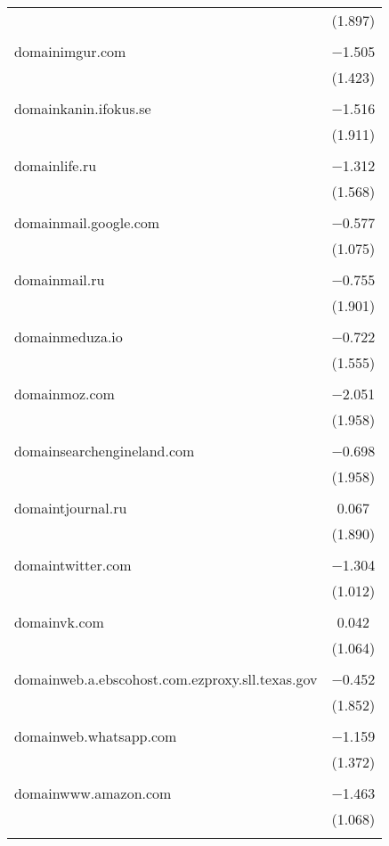 \begin{table}[!htbp]
\begin{tabular}{@{\extracolsep{5pt}}lc}
  & (1.897) \\ 
  & \\ 
 domainimgur.com & $-$1.505 \\ 
  & (1.423) \\ 
  & \\ 
 domainkanin.ifokus.se & $-$1.516 \\ 
  & (1.911) \\ 
  & \\ 
 domainlife.ru & $-$1.312 \\ 
  & (1.568) \\ 
  & \\ 
 domainmail.google.com & $-$0.577 \\ 
  & (1.075) \\ 
  & \\ 
 domainmail.ru & $-$0.755 \\ 
  & (1.901) \\ 
  & \\ 
 domainmeduza.io & $-$0.722 \\ 
  & (1.555) \\ 
  & \\ 
 domainmoz.com & $-$2.051 \\ 
  & (1.958) \\ 
  & \\ 
 domainsearchengineland.com & $-$0.698 \\ 
  & (1.958) \\ 
  & \\ 
 domaintjournal.ru & 0.067 \\ 
  & (1.890) \\ 
  & \\ 
 domaintwitter.com & $-$1.304 \\ 
  & (1.012) \\ 
  & \\ 
 domainvk.com & 0.042 \\ 
  & (1.064) \\ 
  & \\ 
 domainweb.a.ebscohost.com.ezproxy.sll.texas.gov & $-$0.452 \\ 
  & (1.852) \\ 
  & \\ 
 domainweb.whatsapp.com & $-$1.159 \\ 
  & (1.372) \\ 
  & \\ 
 domainwww.amazon.com & $-$1.463 \\ 
  & (1.068) \\ 
  & \\ 

\end{tabular}
\end{table}
